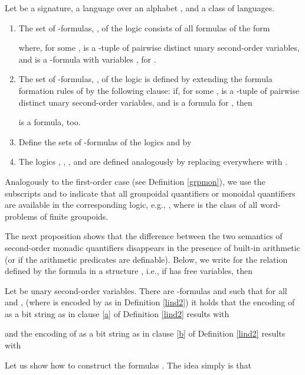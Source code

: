 \documentclass{LMCS}
\begin{document}
\begin{defi}Let  be a signature,    a language over an alphabet , and  a class of languages.
\begin{enumerate}[]
\item The set of -formulas, , of the logic    consists of 
all formulas of the form
  
where, for some ,  is a -tuple of pairwise distinct  unary second-order variables, and   is a -formula with variables , for . 

\item The set of -formulas, ,  of the logic  is defined by extending the formula formation rules of  by the following clause:
if, for some ,  is a -tuple of pairwise distinct  unary second-order variables, and  is a formula for , then 
     
is a formula, too.

\item Define the sets of -formulas of the logics  and  by


\item The logics , , , and   are defined analogously by replacing
 everywhere with .
\end{enumerate}
\end{defi}
\noindent
Analogously to the first-order case (see Definition \ref{grpmon}), we
use the subscripts   and  to indicate that all  groupoidal quantifiers or monoidal quantifiers are available in the corresponding logic, e.g., , where    is the class of all  word-problems of finite groupoids.



The next proposition shows that the difference between the two semantics of second-order monadic quantifiers disappears in the presence of built-in arithmetic (or if the  arithmetic predicates are definable). Below, we write  for the relation defined by the formula  in a structure , i.e., if  has   free variables, then     
 

\begin{lem}\label{suffle} Let  be  unary second-order variables. There are -formulas
  and   such that for all    and  , (where   is encoded by  as in Definition \ref{lind2}) it holds that the encoding of   as a bit string as in clause \ref{a} of Definition \ref{lind2} results with 

and the encoding of  as a bit string as in clause \ref{b} of Definition \ref{lind2} results with 

\end{lem}
\proof 
Let us show how to construct the formulas  . The idea simply is that 
\end{document}
